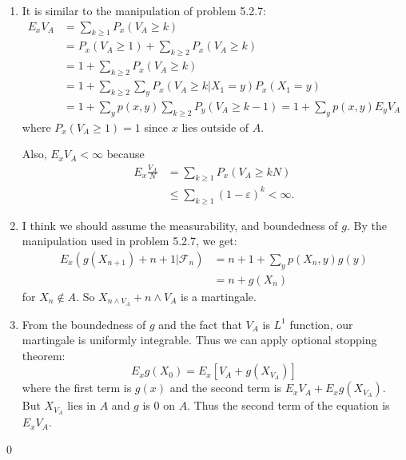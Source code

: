 \begin{problem}[5.2.11]\hfill
	
	\begin{enumerate}
		\item It is similar to the manipulation of problem 5.2.7: 
			\[
				\begin{split}
					E_x V_A & = \sum_{k \geq 1}P_x\left( V_A \geq k \right) \\
					& = P_x \left( V_A \geq 1 \right) + \sum_{k\geq 2}P_x \left( V_A \geq k \right) \\
					& = 1 + \sum_{k\geq 2 } P_x \left( V_A \geq k \right) \\
					& = 1+ \sum_{k\geq 2} \sum_{y}P_x\left( V_A \geq k \lvert X_1 = y \right)P_x\left( X_1 = y \right) \\
					& = 1+ \sum_{y}p(x, y) \sum_{k\geq 2 }P_y\left( V_A \geq k-1 \right) = 1+\sum_y p(x, y)E_y V_A
				\end{split}
			\]
			where $P_x\left( V_A \geq 1 \right) = 1$ since $x$ lies outside of $A$.

			Also, $E_x V_A < \infty$ because
			\[
				\begin{split}
					E_x \frac{V_A}{N} & = \sum_{k\geq 1} P_x\left( V_A \geq kN \right) \\
					&\leq \sum_{k\geq 1}\left( 1-\varepsilon \right)^k < \infty.
				\end{split}
			\]

		\item I think we should assume the measurability, and boundedness of $g$.
			By the manipulation used in problem 5.2.7, we get:
			\[
				\begin{split}
					E_x\left( g(X_{n+1}) + n+1 \lvert \mathcal{F}_n \right)
					&= n+1+\sum_y p(X_n, y)g(y) \\
					&= n+g(X_n)
				\end{split}
			\]
			for $X_n \notin A$.
			So $X_{n\wedge V_A} + n\wedge V_A$ is a martingale.

		\item From the boundedness of $g$ and the fact that $V_A$ is $L^1$ function, our martingale is uniformly integrable.
			Thus we can apply optional stopping theorem:
			\[
				E_x g(X_0) = E_x \left[ V_A + g(X_{V_A}) \right]
			\]
			where the first term is $g(x)$ and the second term is $E_x V_A + E_x g(X_{V_A})$.
			But $X_{V_A}$ lies in $A$ and $g$ is 0 on $A$.
			Thus the second term of the equation is $E_x V_A$.
	\end{enumerate}
	\qed
\end{problem}
